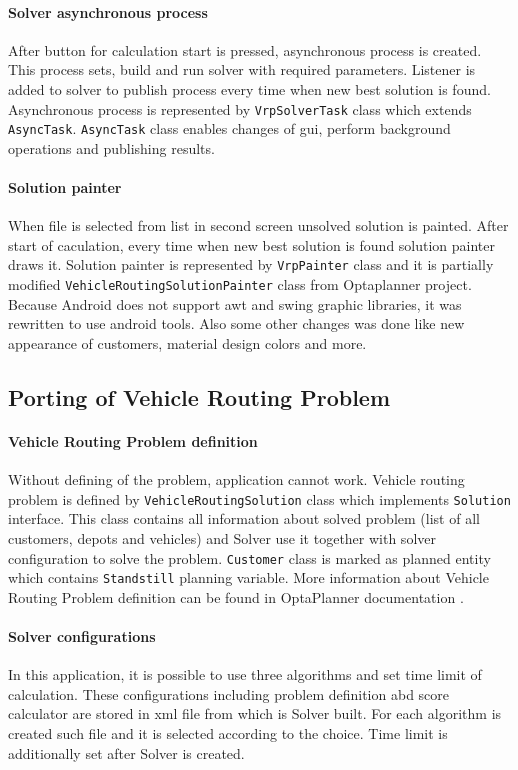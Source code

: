 \paragraph{Solver asynchronous process}
After button for calculation start is pressed, asynchronous process is created. This process sets, build and run solver
with required parameters. Listener is added to solver to publish process every time when new best solution is found.
Asynchronous process is represented by \texttt{VrpSolverTask} class which extends \texttt{AsyncTask}. \texttt{AsyncTask}
class enables changes of gui, perform background operations and publishing results.

\paragraph{Solution painter}
When file is selected from list in second screen unsolved solution is painted. After start of caculation, every time
when new best solution is found solution painter draws it. Solution painter is represented by \texttt{VrpPainter} class
and it is partially modified \texttt{VehicleRoutingSolutionPainter} class from Optaplanner project. Because Android
does not support awt and swing graphic libraries, it was rewritten to use android tools. Also some other changes was
done like new appearance of customers, material design colors and more.

\subsection{Porting of Vehicle Routing Problem}

\paragraph{Vehicle Routing Problem definition}
Without defining of the problem, application cannot work. Vehicle routing problem is defined by
\texttt{VehicleRoutingSolution} class which implements \texttt{Solution} interface. This class contains all information
about solved problem (list of all customers, depots and vehicles) and Solver use it together with solver configuration
to solve the problem. \texttt{Customer} class is marked as planned entity which contains \texttt{Standstill} planning
variable. More information about Vehicle Routing Problem definition can be found in OptaPlanner documentation
\cite{OptaPlannerDoc}.

\paragraph{Solver configurations}
In this application, it is possible to use three algorithms and set time limit of calculation. These configurations
including problem definition abd score calculator are stored in xml file from which is Solver built. For each algorithm
is created such file and it is selected according to the choice. Time limit is additionally set after Solver is created.


